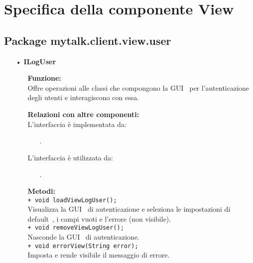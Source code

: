 \section{Specifica della componente View} {
\begin{sloppypar}
	\subsection{Package mytalk.client.view.user} {
		\begin{itemize}

		\item[•] \textbf{ILogUser}
		\begin{itemize}

			\item[] \textbf{Funzione:}\\
				Offre operazioni alle classi che compongono la GUI\g~ per l'autenticazione degli utenti e interagiscono con essa.

			\item[] \textbf{Relazioni con altre componenti:}\\
				L'interfaccia è implementata da:
				\begin{itemize}
					\item[] .
				\end{itemize}
				L’interfaccia è utilizzata da:
				\begin{itemize}
					\item[] .
				\end{itemize}

			\item[] \textbf{Metodi:}\\
				\texttt{+ void loadViewLogUser();}\\
				Visualizza la GUI\g~ di autenticazione e seleziona le impostazioni di default\g~, i campi vuoti e l'errore (non visibile).\\

				\texttt{+ void removeViewLogUser();}\\
				Nasconde la GUI\g~ di autenticazione.\\

				\texttt{+ void errorView(String error);}\\
				Imposta e rende visibile il messaggio di errore.\\
		\end{itemize}
		

\end{itemize}}
\end{sloppypar}}
